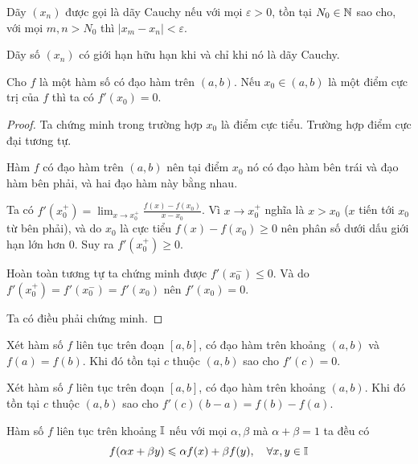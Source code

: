 \begin{definition}
    Dãy $(x_n)$ được gọi là dãy Cauchy nếu với mọi $\varepsilon > 0$, tồn tại $N_0 \in \mathbb{N}$ sao cho, với mọi $m, n > N_0$ thì $\lvert x_m - x_n \rvert < \varepsilon$.
\end{definition}

\begin{theorem}
    Dãy số $(x_n)$ có giới hạn hữu hạn khi và chỉ khi nó là dãy Cauchy.
\end{theorem}

\begin{theorem}[Bổ đề Fermat]
    Cho $f$ là một hàm số có đạo hàm trên $(a, b)$. Nếu $x_0 \in (a, b)$ là một điểm cực trị của $f$ thì ta có $f'(x_0) = 0$.
\end{theorem}

\begin{proof}
    Ta chứng minh trong trường hợp $x_0$ là điểm cực tiểu. Trường hợp điểm cực đại tương tự.

    Hàm $f$ có đạo hàm trên $(a, b)$ nên tại điểm $x_0$ nó có đạo hàm bên trái và đạo hàm bên phải, và hai đạo hàm này bằng nhau.

    Ta có $\displaystyle{f'(x_0^+) = \lim_{x \to x_0^+} \frac{f(x) - f(x_0)}{x - x_0}}$. Vì $x \to x_0^+$ nghĩa là $x > x_0$ ($x$ tiến tới $x_0$ từ bên phải), và do $x_0$ là cực tiểu $f(x) - f(x_0) \geqslant 0$ nên phân số dưới dấu giới hạn lớn hơn 0. Suy ra $f'(x_0^+) \geqslant 0$.

    Hoàn toàn tương tự ta chứng minh được $f'(x_0^-) \leqslant 0$. Và do $f'(x_0^+) = f'(x_0^-) = f'(x_0)$ nên $f'(x_0) = 0$.

    Ta có điều phải chứng minh.
\end{proof}

\begin{theorem}
    Xét hàm số $f$ liên tục trên đoạn $[a, b]$, có đạo hàm trên khoảng $(a, b)$ và $f(a) = f(b)$. Khi đó tồn tại $c$ thuộc $(a, b)$ sao cho $f'(c) = 0$.
\end{theorem}

\begin{theorem}
    Xét hàm số $f$ liên tục trên đoạn $[a, b]$, có đạo hàm trên khoảng $(a, b)$. Khi đó tồn tại $c$ thuộc $(a, b)$ sao cho $f'(c) (b - a) = f(b) - f(a)$.
\end{theorem}

\begin{definition}
    Hàm số $f$ liên tục trên khoảng $\mathbb{I}$ nếu với mọi $\alpha, \beta$ mà $\alpha + \beta = 1$ ta đều có 
    \begin{equation}
        f(\alpha x + \beta y) \leqslant \alpha f(x) + \beta f(y), \quad \forall x, y \in \mathbb{I}
    \end{equation}
\end{definition}